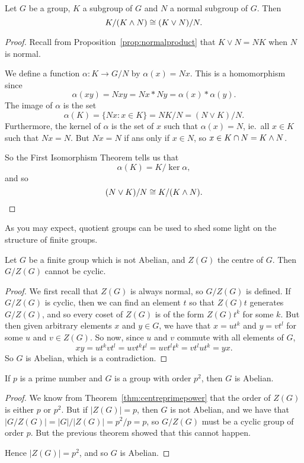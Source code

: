 \begin{theorem}
  Let $G$ be a group, $K$ a subgroup of $G$ and $N$ a normal subgroup 
  of $G$.  Then
  \[
    K/(K \wedge N) \cong (K \vee N)/N.
  \]
\end{theorem}
\begin{proof}
  Recall from Proposition~\ref{prop:normalproduct} that $K \vee N = 
  NK$ when $N$ is normal.
  
  We define a function $\alpha: K \to G/N$ by $\alpha(x) = Nx$.  This
  is a homomorphism since
  \[
    \alpha(xy) = Nxy = Nx \ast Ny = \alpha(x) \ast \alpha(y).
  \]
  The image of $\alpha$ is the set
  \[
    \alpha(K) = \{ Nx : x \in K \} = NK/N = (N \vee K)/N.
  \]
  Furthermore, the kernel of $\alpha$ is the set of $x$ such that 
  $\alpha(x) = N$, ie.~all $x \in K$ such that $Nx = N$.  But $Nx = N$ 
  if ans only if $x \in N$, so $x \in K \cap N = K \wedge N$.
  
  So the First Isomorphism Theorem tells us that
  \[
    \alpha(K) = K/\ker \alpha,
  \]
  and so
  \[
    (N \vee K)/N \cong K/(K \wedge N).
  \]
\end{proof}


As you may expect, quotient groups can be used to shed some light on 
the structure of finite groups.

\begin{theorem}\label{thm:centrequotient}
  Let $G$ be a finite group which is not Abelian, and $Z(G)$ the
  centre of $G$.  Then $G/Z(G)$ cannot be cyclic.
\end{theorem}
\begin{proof}
  We first recall that $Z(G)$ is always normal, so $G/Z(G)$ is defined.
  If $G/Z(G)$ is cyclic, then we can find an element $t$ so that 
  $Z(G)t$ generates $G/Z(G)$, and so every coset of $Z(G)$ is of the 
  form $Z(G)t^{k}$ for some $k$. But then given arbitrary elements $x$ 
  and $y \in G$, we have that $x = ut^{k}$ and $y = vt^{l}$ for some 
  $u$ and $v \in Z(G)$.  So now, since $u$ and $v$ commute with all 
  elements of $G$,
  \[
    xy = ut^{k}vt^{l} = uvt^{k}t^{l} = uvt^{l}t^{k} = vt^{l}ut^{k} = 
    yx.
  \]
  So $G$ is Abelian, which is a contradiction.
\end{proof}

\begin{corollary}
  If $p$ is a prime number and $G$ is a group with order $p^{2}$, 
  then $G$ is Abelian.
\end{corollary}
\begin{proof}
  We know from Theorem~\ref{thm:centreprimepower} that the order of
  $Z(G)$ is either $p$ or $p^{2}$.  But if $|Z(G)| = p$, then $G$ is
  not Abelian, and we have that $|G/Z(G)| = |G|/|Z(G)| = p^{2}/p = p$,
  so $G/Z(G)$ must be a cyclic group of order $p$.  But the previous
  theorem showed that this cannot happen.
  
  Hence $|Z(G)| = p^{2}$, and so $G$ is Abelian.
\end{proof}

